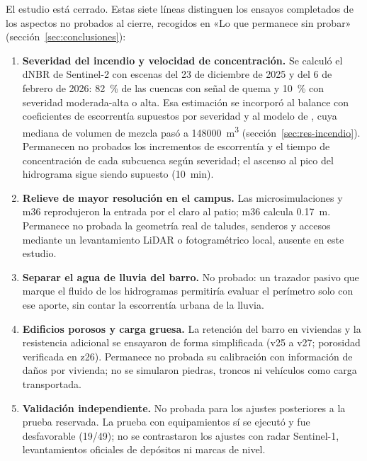 El estudio está cerrado. Estas siete líneas distinguen los ensayos completados de los aspectos no probados al cierre, recogidos en «Lo que permanece sin probar» (sección~\ref{sec:conclusiones}):
\begin{enumerate}
\item \textbf{Severidad del incendio y velocidad de concentración.} Se calculó el dNBR de Sentinel-2 con escenas del 23 de diciembre de 2025 y del 6 de febrero de 2026: \SI{82}{\percent} de las cuencas con señal de quema y \SI{10}{\percent} con severidad moderada-alta o alta. Esa estimación se incorporó al balance con coeficientes de escorrentía supuestos por severidad y al modelo de \citet{gartner2014}, cuya mediana de volumen de mezcla pasó a \SI{148000}{m^3} (sección~\ref{sec:res-incendio}). Permanecen no probados los incrementos de escorrentía y el tiempo de concentración de cada subcuenca según severidad; el ascenso al pico del hidrograma sigue siendo supuesto (\SI{10}{min}).
\item \textbf{Relieve de mayor resolución en el campus.} Las microsimulaciones y m36 reprodujeron la entrada por el claro al patio; m36 calcula \SI{0,17}{m}. Permanece no probada la geometría real de taludes, senderos y accesos mediante un levantamiento LiDAR o fotogramétrico local, ausente en este estudio.
\item \textbf{Separar el agua de lluvia del barro.} No probado: un trazador pasivo que marque el fluido de los hidrogramas permitiría evaluar el perímetro solo con ese aporte, sin contar la escorrentía urbana de la lluvia.
\item \textbf{Edificios porosos y carga gruesa.} La retención del barro en viviendas y la resistencia adicional se ensayaron de forma simplificada (v25 a v27; porosidad verificada en z26). Permanece no probada su calibración con información de daños por vivienda; no se simularon piedras, troncos ni vehículos como carga transportada.
\item \textbf{Validación independiente.} No probada para los ajustes posteriores a la prueba reservada. La prueba con equipamientos sí se ejecutó y fue desfavorable (19/49); no se contrastaron los ajustes con radar Sentinel-1, levantamientos oficiales de depósitos ni marcas de nivel.

\end{enumerate}
